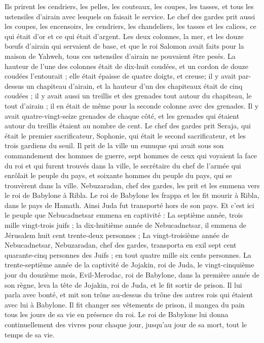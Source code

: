 \begin{multicols}{2}
Ils prirent les cendriers, les pelles, les couteaux, les coupes, les tasses, et tous les ustensiles d'airain avec lesquels on faisait le service.
Le chef des gardes prit aussi les coupes, les encensoirs, les cendriers, les chandeliers, les tasses et les calices, ce qui était d'or et ce qui était d'argent.
Les deux colonnes, la mer, et les douze bœufs d'airain qui servaient de base, et que le roi Salomon avait faits pour la maison de Yahweh, tous ces ustensiles d'airain ne pouvaient être pesés.
La hauteur de l'une des colonnes était de dix-huit coudées, et un cordon de douze coudées l'entourait ; elle était épaisse de quatre doigts, et creuse;
il y avait par-dessus un chapiteau d'airain, et la hauteur d'un des chapiteaux était de cinq coudées ; il y avait aussi un treillis et des grenades tout autour du chapiteau, le tout d'airain ; il en était de même pour la seconde colonne avec des grenades.
Il y avait quatre-vingt-seize grenades de chaque côté, et les grenades qui étaient autour du treillis étaient au nombre de cent.
Le chef des gardes prit Seraja, qui était le premier sacrificateur, Sophonie, qui était le second sacrificateur, et les trois gardiens du seuil.
Il prit de la ville un eunuque qui avait sous son commandement des hommes de guerre, sept hommes de ceux qui voyaient la face du roi et qui furent trouvés dans la ville, le secrétaire du chef de l'armée qui enrôlait le peuple du pays, et soixante hommes du peuple du pays, qui se trouvèrent dans la ville.
Nebuzaradan, chef des gardes, les prit et les emmena vers le roi de Babylone à Ribla.
Le roi de Babylone les frappa et les fit mourir à Ribla, dans le pays de Hamath. Ainsi Juda fut transporté hors de son pays.
Et c'est ici le peuple que Nebucadnetsar emmena en captivité : La septième année, trois mille vingt-trois juifs ;
la dix-huitième année de Nebucadnetsar, il emmena de Jérusalem huit cent trente-deux personnes ;
La vingt-troisième année de Nebucadnetsar, Nebuzaradan, chef des gardes, transporta en exil sept cent quarante-cinq personnes des Juifs ; en tout quatre mille six cents personnes.
La trente-septième année de la captivité de Jojakin, roi de Juda, le vingt-cinquième jour du douzième mois, Evil-Merodac, roi de Babylone, dans la première année de son règne, leva la tête de Jojakin, roi de Juda, et le fit sortir de prison.
Il lui parla avec bonté, et mit son trône au-dessus du trône des autres rois qui étaient avec lui à Babylone.
Il fit changer ses vêtements de prison, il mangea du pain tous les jours de sa vie en présence du roi.
Le roi de Babylone lui donna continuellement des vivres pour chaque jour, jusqu'au jour de sa mort, tout le temps de sa vie.
\PPE{}
\end{multicols}
